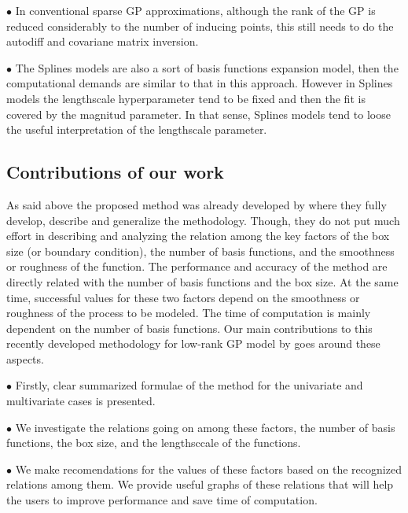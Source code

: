 \documentclass[]{interact}
\theoremstyle{plain}%
\theoremstyle{definition}
\theoremstyle{remark}
\begin{document}
\vspace{2mm}
$\bullet$ In conventional sparse GP approximations, although the rank of the GP is reduced considerably to the number of inducing points, this still needs to do the autodiff and covariane matrix inversion.

\vspace{2mm}
$\bullet$ The Splines models are also a sort of basis functions expansion model, then the computational demands are similar to that in this approach. However in Splines models the lengthscale hyperparameter tend to be fixed and then the fit is covered by the magnitud parameter. In that sense, Splines models tend to loose the useful interpretation of the lengthscale parameter.


\subsection{Contributions of our work}

As said above the proposed method was already developed by \cite{solin2018hilbert} where they fully develop, describe and generalize the methodology. Though, they do not put much effort in describing and analyzing the relation among the key factors of the box size (or boundary condition), the number of basis functions, and the smoothness or roughness of the function. The performance and accuracy of the method are directly related with the number of basis functions and the box size. At the same time, successful values for these two factors depend on the smoothness or roughness of the process to be modeled. The time of computation is mainly dependent on the number of basis functions. Our main contributions to this recently developed methodology for low-rank GP model by \cite{solin2018hilbert} goes around these aspects.

\vspace{2mm}
$\bullet$ Firstly, clear summarized formulae of the method for the univariate and multivariate cases is presented. 

\vspace{2mm}
$\bullet$ We investigate the relations going on among these factors, the number of basis functions, the box size, and the lengthsccale of the functions.

\vspace{2mm}
$\bullet$ We make recomendations for the values of these factors based on the recognized relations among them. We provide useful graphs of these relations that will help the users to improve performance and save time of computation.
\end{document}
